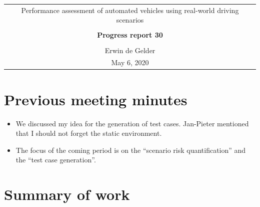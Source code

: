 \documentclass[10pt,final,a4paper,oneside,onecolumn]{article}
\newcommand{\progressreportnumber}{30}
\renewcommand{\author}{Erwin de Gelder}
\renewcommand{\date}{May 6, 2020}
\renewcommand{\title}{Performance assessment of automated vehicles using real-world driving scenarios}
\begin{document}
	
\begin{center}
	\begin{tabular}{c}
		\title \\ \\
		\textbf{\huge Progress report \progressreportnumber} \\ \\
		\author \\ 
		\date
	\end{tabular}
\end{center}

\section{Previous meeting minutes}

\begin{itemize}
	\item We discussed my idea for the generation of test cases. Jan-Pieter mentioned that I should not forget the static environment.
	\item The focus of the coming period is on the ``scenario risk quantification'' and the ``test case generation''.
\end{itemize}



\section{Summary of work}
\end{document}
